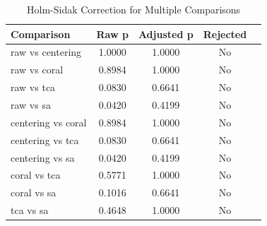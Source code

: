 \begin{table}[htbp]
\centering
\caption{Holm-Sidak Correction for Multiple Comparisons}
\label{tab:holmsidak}
\begin{tabular}{lcccc}
\toprule
Comparison & Raw p & Adjusted p & Rejected \\
\midrule
raw vs centering & 1.0000 & 1.0000 & No \\
raw vs coral & 0.8984 & 1.0000 & No \\
raw vs tca & 0.0830 & 0.6641 & No \\
raw vs sa & 0.0420 & 0.4199 & No \\
centering vs coral & 0.8984 & 1.0000 & No \\
centering vs tca & 0.0830 & 0.6641 & No \\
centering vs sa & 0.0420 & 0.4199 & No \\
coral vs tca & 0.5771 & 1.0000 & No \\
coral vs sa & 0.1016 & 0.6641 & No \\
tca vs sa & 0.4648 & 1.0000 & No \\
\bottomrule
\end{tabular}
\end{table}